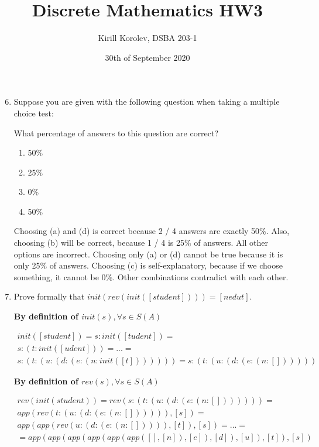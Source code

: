 \documentclass{article}
\title{Discrete Mathematics HW3}
\author{Kirill Korolev, DSBA 203-1}
\date{30th of September 2020}
\begin{document}
\maketitle

\begin{enumerate}
\setcounter{enumi}{5}

\item Suppose you are given with the following question when taking a multiple choice test:

What percentage of answers to this question are correct?

\begin{enumerate}
\item 50\%
\item 25\%
\item 0\%
\item 50\%
\end{enumerate}

Choosing (a) and (d) is correct because 2 / 4 answers are exactly 50\%. Also, choosing (b) will be correct, because 1 / 4 is 25\% of answers. All other options are incorrect. Choosing only (a) or (d) cannot be true because it is only 25\% of answers. Choosing (c) is self-explanatory, because if we choose something, it cannot be 0\%. Other combinations contradict with each other.

\item Prove formally that $init(rev(init([student]))) = [nedut]$.

\textbf{By definition of $init(s), \forall s \in S(A)$}

\begin{align*}
init([student]) = s : init([tudent]) =\\ s : (t : init([udent])) = ... =\\ s : (t : (u : (d : (e : (n : init([t])))))) = s : (t : (u : (d : (e : (n : [])))))
\end{align*}

\textbf{By definition of $rev(s), \forall s \in S(A)$}

\begin{align*}
rev(init(student)) = rev(s : (t : (u : (d : (e : (n : [])))))) =\\
app(rev(t : (u : (d : (e : (n : []))))), [s]) =\\ app(app(rev(u : (d : (e : (n : [])))), [t]), [s]) = ... = \\ = app(app(app(app(app(app([], [n]), [e]), [d]), [u]), [t]), [s]) 
\end{align*}


\end{enumerate}
\end{document}
